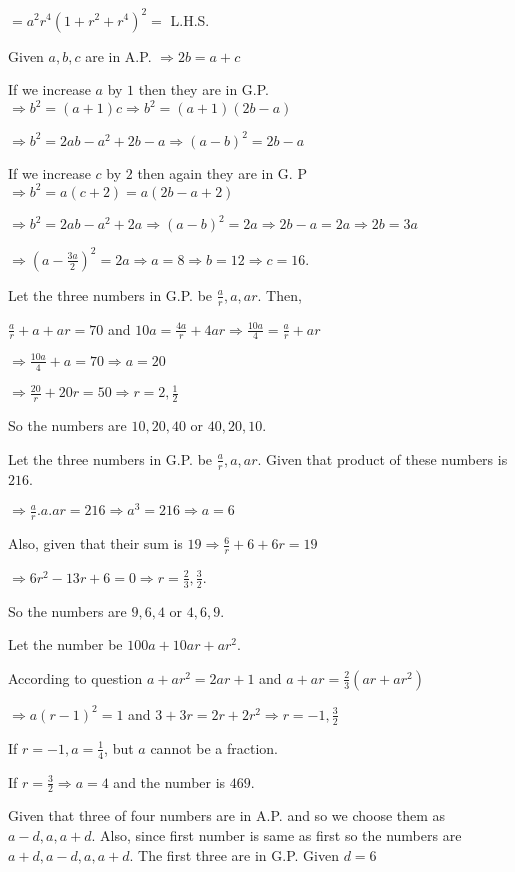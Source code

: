   $= a^2r^4(1 + r^2 + r^4)^2 =$ L.H.S.
\item Given $a, b, c$ are in A.P. $\Rightarrow 2b = a + c$

  If we increase $a$ by $1$ then they are in G.P. $\Rightarrow b^2 = (a + 1)c \Rightarrow b^2 = (a + 1)(2b - a)$

  $\Rightarrow b^2 = 2ab - a^2 + 2b - a \Rightarrow (a - b)^2 = 2b - a$

  If we increase $c$ by $2$ then again they are in G. P $\Rightarrow b^2 = a(c + 2) = a(2b - a + 2)$

  $\Rightarrow b^2 = 2ab - a^2 + 2a \Rightarrow (a - b)^2 = 2a \Rightarrow 2b - a = 2a \Rightarrow 2b = 3a$

  $\Rightarrow \left(a - \frac{3a}{2}\right)^2 = 2a \Rightarrow a = 8 \Rightarrow b = 12 \Rightarrow c = 16$.
\item Let the three numbers in G.P. be $\frac{a}{r}, a, ar$. Then,

  $\frac{a}{r} + a + ar = 70$ and $10a = \frac{4a}{r} + 4ar \Rightarrow \frac{10a}{4} = \frac{a}{r} + ar$

  $\Rightarrow \frac{10a}{4} + a = 70 \Rightarrow a = 20$

  $\Rightarrow \frac{20}{r} + 20r = 50 \Rightarrow r = 2, \frac{1}{2}$

  So the numbers are $10, 20, 40$ or $40, 20, 10$.
\item Let the three numbers in G.P. be $\frac{a}{r}, a, ar$. Given that product of these numbers is $216$.

  $\Rightarrow \frac{a}{r}.a.ar = 216 \Rightarrow a^3 = 216 \Rightarrow a = 6$

  Also, given that their sum is $19 \Rightarrow \frac{6}{r} + 6 + 6r = 19$

  $\Rightarrow 6r^2 - 13r + 6 = 0 \Rightarrow r = \frac{2}{3}, \frac{3}{2}$.

  So the numbers are $9, 6, 4$ or $4, 6, 9$.
\item Let the number be $100a + 10ar + ar^2$.

  According to question $a + ar^2 = 2ar + 1$ and $a + ar = \frac{2}{3}(ar + ar^2)$

  $\Rightarrow a(r - 1)^2 = 1$ and $3 + 3r = 2r + 2r^2 \Rightarrow r = -1, \frac{3}{2}$

  If $r = -1, a = \frac{1}{4}$, but $a$ cannot be a fraction.

  If $r = \frac{3}{2} \Rightarrow a = 4$ and the number is $469$.
\item Given that three of four numbers are in A.P. and so we choose them as $a - d, a, a + d$. Also, since first number is same as
  first so the numbers are $a + d, a - d, a, a + d$. The first three are in G.P. Given $d = 6$

